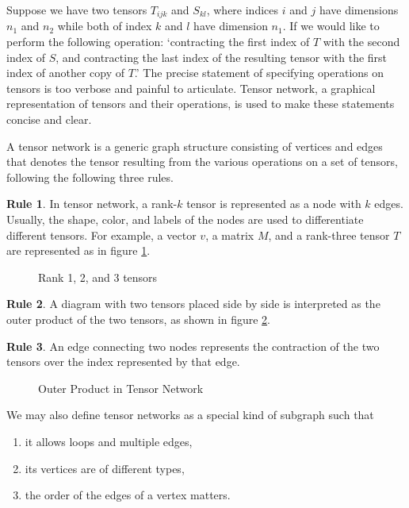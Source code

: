 Suppose we have two tensors $T_{ijk}$ and $S_{kl}$, where indices $i$ and $j$ have dimensions $n_1$ and $n_2$ while both of index $k$ and $l$ have dimension $n_1$.
If we would like to perform the following operation: `contracting the first index of $T$ with the second index of $S$, and contracting the last index of the resulting tensor with the first index of another copy of $T$.' 
The precise statement of specifying operations on tensors is too verbose and painful to articulate.
Tensor network, a graphical representation of tensors and their operations, is used to make these statements concise and clear.

\begin{definition}
	A tensor network is a generic graph structure consisting of vertices and edges that denotes the tensor resulting from the various operations on a set of tensors, following the following three rules.


\textbf{Rule 1}. In tensor network, a rank-$k$ tensor is represented as a node with $k$ edges.
Usually, the shape, color, and labels of the nodes are used to differentiate different tensors.
For example, a vector $v$, a matrix $M$, and a rank-three tensor $T$ are represented as in figure \ref{fig:simple_tensors}.

\begin{figure}[ht]
	\centering
	
	\caption{Rank 1, 2, and 3 tensors}
	\label{fig:simple_tensors}
\end{figure}

\textbf{Rule 2}. A diagram with two tensors placed side by side is interpreted as the outer product of the two tensors, as shown in figure \ref{fig:tensor-product}.

\textbf{Rule 3}. An edge connecting two nodes represents the contraction of the two tensors over the index represented by that edge.
\begin{figure}[ht]
	\centering
	
	\caption{Outer Product in Tensor Network}
	\label{fig:tensor-product}
\end{figure}

\end{definition}

We may also define tensor networks as a special kind of subgraph such that
\begin{enumerate}
		\item it allows loops and multiple edges,
		\item its vertices are of different types,
		\item the order of the edges of a vertex matters.
\end{enumerate}

